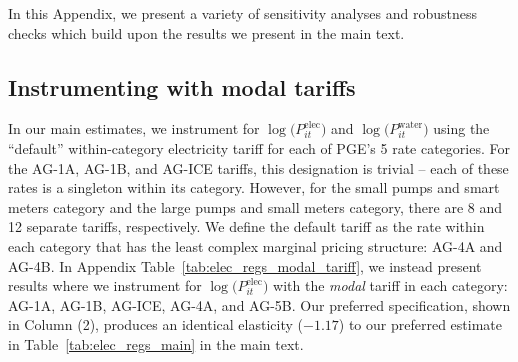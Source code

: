 In this Appendix, we present a variety of sensitivity analyses and robustness checks which build upon the results we present in the main text.



\subsection{Instrumenting with modal tariffs}
\label{app:sens_modal_iv}
In our main estimates, we instrument for $\log\big(P^{\text{elec}}_{it}\big)$ and $\log\big(P^{\text{water}}_{it}\big)$ using the ``default'' within-category electricity tariff for each of PGE's 5 rate categories.  For the AG-1A, AG-1B, and AG-ICE tariffs, this designation is trivial -- each of these rates is a singleton within its category. However, for the small pumps and smart meters category and the large pumps and small meters category, there are 8 and 12 separate tariffs, respectively. We define the default tariff as the rate within each category that has the least complex marginal pricing structure: AG-4A and AG-4B. In Appendix Table~\ref{tab:elec_regs_modal_tariff}, we instead present results where we instrument for $\log\big(P^{\text{elec}}_{it}\big)$ with the \emph{modal} tariff in each category: AG-1A, AG-1B, AG-ICE, AG-4A, and AG-5B. Our preferred specification, shown in Column (2), produces an identical elasticity ($-1.17$) to our preferred estimate in Table~\ref{tab:elec_regs_main} in the main text.


\FloatBarrier
